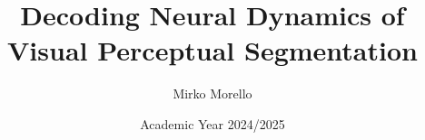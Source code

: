 \documentclass[a4paper]{report}
\title{Decoding Neural Dynamics of Visual Perceptual Segmentation}
\author{Mirko Morello}
\date{Academic Year 2024/2025}
\begin{document}
\maketitlepage
\end{document}
